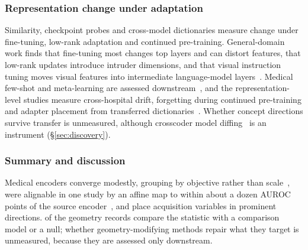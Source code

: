 \subsubsection{Representation change under adaptation}

Similarity, checkpoint probes and cross-model dictionaries measure change under fine-tuning,
low-rank adaptation and continued pre-training. General-domain work finds that fine-tuning most changes top layers and can distort features, that
low-rank updates introduce intruder dimensions, and that visual instruction tuning moves visual features
into intermediate language-model
layers~\cite{merchant2020what,zhou2021closer,kumar2022fine,lee2022surgical,raghu2019rapid,biderman2024lora,shuttleworth2024lora,palacios2026visual,verma2024cross}.
Medical few-shot and meta-learning are assessed downstream~\cite{bo2025famnet,wang2025task}, and the
representation-level studies measure cross-hospital drift, forgetting during continued pre-training and
adapter placement from transferred
dictionaries~\cite{theofilou2025stable,zoellin2024block,sadanandan2026mechanistically}. Whether concept
directions survive transfer is unmeasured, although crosscoder model diffing~\cite{minder2025overcoming} is
an instrument (\S\ref{sec:discovery}).


\subsubsection{Summary and discussion}

Medical encoders converge modestly, grouping by objective rather than scale~\cite{tayebiarasteh2026self},
were alignable in one study by an affine map to within about a dozen AUROC points of the source
encoder~\cite{folco2025semantic}, and place acquisition variables in prominent directions.
\Vgeoany{} of the \Vgeon{} geometry records compare the statistic with a comparison model or a null; whether geometry-modifying methods repair what they target is unmeasured,
because they are assessed only downstream.

